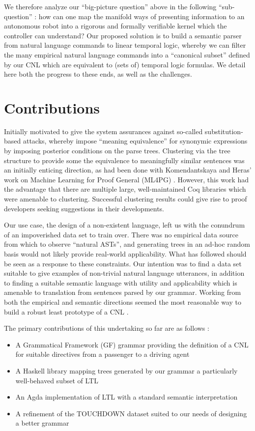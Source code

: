 \documentclass{article}
\begin{document}
We therefore analyze our ``big-picture question'' above in the following
``sub-question'' : how can one map the manifold ways of presenting information
to an autonomous robot into a rigorous and formally verifiable kernel which the
controller can understand? Our proposed solution is to build a semantic parser
from natural language commands to linear temporal logic, whereby we can filter
the many empirical natural language commands into a ``canonical subset'' defined
by our CNL which are equivalent to (sets of) temporal logic formulas. We detail
here both the progress to these ends, as well as the challenges.

\section{Contributions}

Initially
motivated to give the system assurances against so-called
substitution-based attacks, whereby impose ``meaning equivalence'' for synonymic
expressions by imposing posterior conditions on the parse trees. Clustering via
the tree structure to provide some the equivalence to meaningfully similar
sentences was an initially enticing direction, as had been done with
Komendantskaya and Heras' work on Machine Learning for Proof General (ML4PG)
\cite{ml4pg}. However, this work had the advantage that there are multiple
large, well-maintained Coq libraries which were amenable to clustering.
Successful clustering results could give rise to proof developers seeking
suggestions in their developments.

Our use case, the design of a non-existent language, left us with the conundrum
of an impoverished data set to train over. There was no empirical data source
from which to observe ``natural ASTs'', and generating trees in an ad-hoc random basis would
not likely provide real-world applicability. What has followed should be seen as
a response to these constraints. Our intention was to find a data set suitable
to give examples of non-trivial natural language utterances, in addition to
finding a suitable semantic language with utility and applicability which is
amenable to translation from sentences parsed by our grammar. Working from both
the empirical and semantic directions seemed the most reasonable way to build a
robust least prototype of a CNL .

The primary contributions of this undertaking so far are as follows :

\begin{itemize}[noitemsep]
\item A Grammatical Framework (GF) grammar providing the definition of a CNL for
suitable directives from a passenger to a driving agent
\item A Haskell library mapping trees generated by our grammar a particularly well-behaved subset of LTL
\item An Agda implementation of LTL with a standard semantic interpretation
\item A refinement of the TOUCHDOWN dataset \cite{chen2019touchdown} suited to our needs of designing a
better grammar
\end{itemize}
\end{document}
